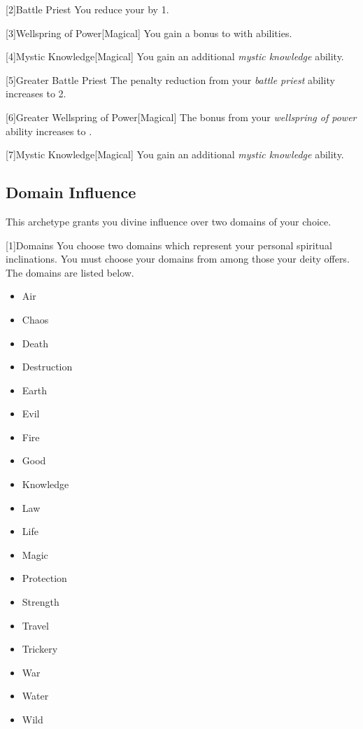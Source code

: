         [2]{Battle Priest} You reduce your  by 1.

        [3]{Wellspring of Power}[Magical]
        You gain a  bonus to  with  abilities.

        [4]{Mystic Knowledge}[Magical]
        You gain an additional \textit{mystic knowledge} ability.

        [5]{Greater Battle Priest} The penalty reduction from your \textit{battle priest} ability increases to 2.

        [6]{Greater Wellspring of Power}[Magical]
        The bonus from your \textit{wellspring of power} ability increases to .

        [7]{Mystic Knowledge}[Magical]
        You gain an additional \textit{mystic knowledge} ability.

    \subsection{Domain Influence}
        This archetype grants you divine influence over two domains of your choice.

        [1]{Domains}
        You choose two domains which represent your personal spiritual inclinations.
        You must choose your domains from among those your deity offers.
        The domains are listed below.

        \begin{itemize}
            \item{Air}
            \item{Chaos}
            \item{Death}
            \item{Destruction}
            \item{Earth}
            \item{Evil}
            \item{Fire}
            \item{Good}
            \item{Knowledge}
            \item{Law}
            \item{Life}
            \item{Magic}
            \item{Protection}
            \item{Strength}
            \item{Travel}
            \item{Trickery}
            \item{War}
            \item{Water}
            \item{Wild}
        \end{itemize}


